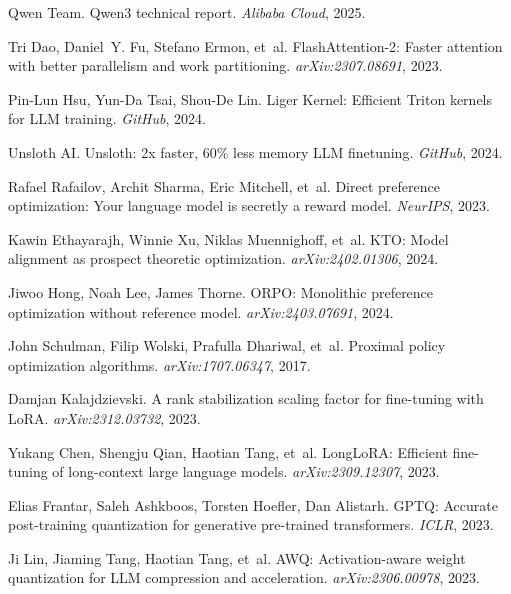 \documentclass[11pt,letterpaper]{article}
\begin{document}
\begin{thebibliography}{99}
Qwen Team.
\newblock Qwen3 technical report.
\newblock \emph{Alibaba Cloud}, 2025.

Tri Dao, Daniel~Y. Fu, Stefano Ermon, et~al.
\newblock FlashAttention-2: Faster attention with better parallelism and work partitioning.
\newblock \emph{arXiv:2307.08691}, 2023.

Pin-Lun Hsu, Yun-Da Tsai, Shou-De Lin.
\newblock Liger Kernel: Efficient Triton kernels for LLM training.
\newblock \emph{GitHub}, 2024.

Unsloth AI.
\newblock Unsloth: 2x faster, 60\% less memory LLM finetuning.
\newblock \emph{GitHub}, 2024.

Rafael Rafailov, Archit Sharma, Eric Mitchell, et~al.
\newblock Direct preference optimization: Your language model is secretly a reward model.
\newblock \emph{NeurIPS}, 2023.

Kawin Ethayarajh, Winnie Xu, Niklas Muennighoff, et~al.
\newblock KTO: Model alignment as prospect theoretic optimization.
\newblock \emph{arXiv:2402.01306}, 2024.

Jiwoo Hong, Noah Lee, James Thorne.
\newblock ORPO: Monolithic preference optimization without reference model.
\newblock \emph{arXiv:2403.07691}, 2024.

John Schulman, Filip Wolski, Prafulla Dhariwal, et~al.
\newblock Proximal policy optimization algorithms.
\newblock \emph{arXiv:1707.06347}, 2017.

Damjan Kalajdzievski.
\newblock A rank stabilization scaling factor for fine-tuning with LoRA.
\newblock \emph{arXiv:2312.03732}, 2023.

Yukang Chen, Shengju Qian, Haotian Tang, et~al.
\newblock LongLoRA: Efficient fine-tuning of long-context large language models.
\newblock \emph{arXiv:2309.12307}, 2023.

Elias Frantar, Saleh Ashkboos, Torsten Hoefler, Dan Alistarh.
\newblock GPTQ: Accurate post-training quantization for generative pre-trained transformers.
\newblock \emph{ICLR}, 2023.

Ji Lin, Jiaming Tang, Haotian Tang, et~al.
\newblock AWQ: Activation-aware weight quantization for LLM compression and acceleration.
\newblock \emph{arXiv:2306.00978}, 2023.


\end{thebibliography}
\end{document}
